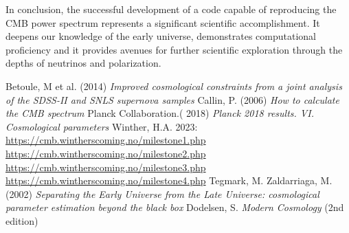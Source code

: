 \documentclass{aa}
\begin{document}
In conclusion, the successful development of a code capable of reproducing the CMB power spectrum represents a significant scientific accomplishment. It deepens our knowledge of the early universe, demonstrates computational proficiency and it provides avenues for further scientific exploration through the depths of neutrinos and polarization.
\newpage
\begin{thebibliography}{}
%
 Betoule, M et al. (2014) \textit{Improved cosmological constraints from a joint analysis of the SDSS-II and SNLS supernova samples}
 Callin, P. (2006) \textit{How to calculate the CMB spectrum}
 Planck Collaboration.( 2018) \textit{Planck 2018 results. VI. Cosmological parameters}
 Winther, H.A. 2023: \\
      \href{https://cmb.wintherscoming.no/milestone1.php}{https://cmb.wintherscoming.no/milestone1.php}
      \href{https://cmb.wintherscoming.no/milestone2.php}{https://cmb.wintherscoming.no/milestone2.php}
      \href{https://cmb.wintherscoming.no/milestone3.php}{https://cmb.wintherscoming.no/milestone3.php}
      \href{https://cmb.wintherscoming.no/milestone4.php}{https://cmb.wintherscoming.no/milestone4.php}
 Tegmark, M. Zaldarriaga, M. (2002) \textit{Separating the Early Universe from the Late Universe: cosmological parameter estimation beyond the black box}
 Dodelsen, S. \textit{Modern Cosmology} (2nd edition)

\end{thebibliography}
\end{document}
